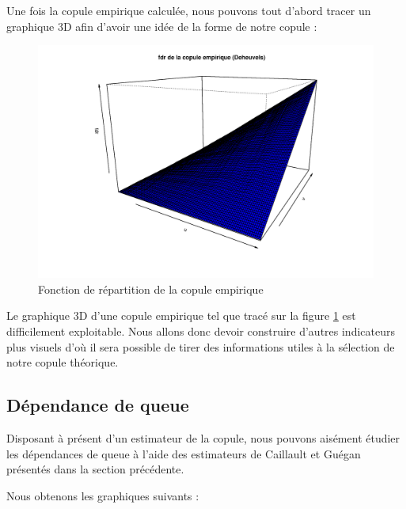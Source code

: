 Une fois la copule empirique calculée, nous pouvons tout d'abord tracer un graphique 3D afin d'avoir une
idée de la forme de notre copule :

\noindent%
\begin{figure}[H]
    \begin{center}
      \includegraphics[width=14 cm, angle=0]{./pictures/copule_empirique.png}
      \centering\caption{\label{graph_cop_empir}Fonction de répartition de la copule empirique}
    \end{center}
\end{figure}


Le graphique 3D d'une copule empirique tel que tracé sur la figure \ref{graph_cop_empir} est difficilement exploitable.
Nous allons donc devoir construire d'autres indicateurs plus visuels d'où il sera possible de tirer des
informations utiles à la sélection de notre copule théorique.



\subsection{Dépendance de queue}

Disposant à présent d'un estimateur de la copule, nous pouvons aisément étudier les dépendances de queue à l'aide des estimateurs de Caillault et Guégan 
présentés dans la section précédente.

Nous obtenons les graphiques suivants :

